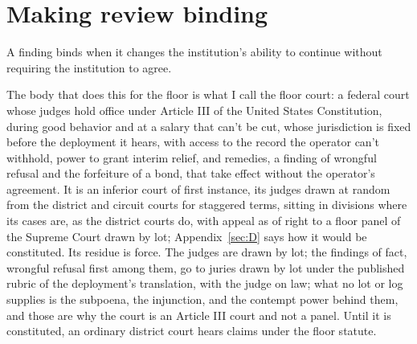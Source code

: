 \section{Making review binding}
\label{sec:14.3}
A finding binds when it changes the institution's ability to continue without requiring the institution to agree.

The body that does this for the floor is what I call the floor court: a federal court whose judges hold office under Article III of the United States Constitution, during good behavior and at a salary that can't be cut, whose jurisdiction is fixed before the deployment it hears, with access to the record the operator can't withhold, power to grant interim relief, and remedies, a finding of wrongful refusal and the forfeiture of a bond, that take effect without the operator's agreement. It is an inferior court of first instance, its judges drawn at random from the district and circuit courts for staggered terms, sitting in divisions where its cases are, as the district courts do, with appeal as of right to a floor panel of the Supreme Court drawn by lot; Appendix~\ref{sec:D} says how it would be constituted. Its residue is force. The judges are drawn by lot; the findings of fact, wrongful refusal first among them, go to juries drawn by lot under the published rubric of the deployment's translation, with the judge on law; what no lot or log supplies is the subpoena, the injunction, and the contempt power behind them, and those are why the court is an Article III court and not a panel. Until it is constituted, an ordinary district court hears claims under the floor statute.
